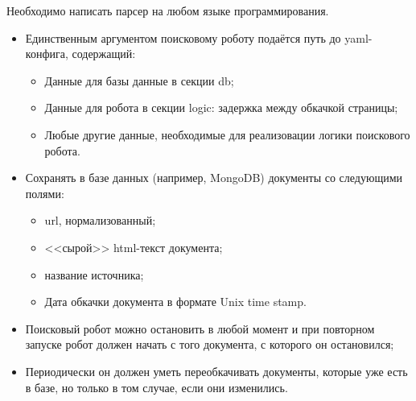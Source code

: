
Необходимо написать парсер на любом языке программирования.
\begin{itemize}
    \item Единственным аргументом поисковому роботу подаётся путь до yaml-конфига, содержащий:
    \begin{itemize}
        \item Данные для базы данные в секции db;
        \item Данные для робота в секции logic: задержка между обкачкой страницы;
        \item Любые другие данные, необходимые для реализовации логики поискового робота.
    \end{itemize}
    \item Сохранять в базе данных (например, MongoDB) документы со следующими полями:
    \begin{itemize}
        \item url, нормализованный;
        \item <<сырой>> html-текст документа;
        \item название источника;
        \item Дата обкачки документа в формате Unix time stamp.
    \end{itemize}
    \item Поисковый робот можно остановить в любой момент и при повторном запуске робот должен начать с того документа, с которого он остановился;
    \item Периодически он должен уметь переобкачивать документы, которые уже есть в базе, но только в том случае, если они изменились.
\end{itemize}

\pagebreak
